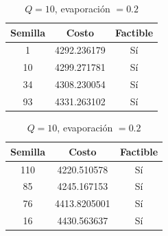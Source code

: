\documentclass{article}
\begin{document}
    \begin{table}[H]
      \begin{minipage}{0.5\linewidth}
        \centering
        \caption{$Q=1$, evaporación $= 0.2$}
        \begin{tabular}{c c c}
          \hline
          Semilla & Costo & Factible \\
          \hline
          1       & 4292.236179 & Sí \\
          10      & 4299.271781 & Sí \\
          34      & 4308.230054 & Sí \\
          93      & 4331.263102 & Sí \\
        \end{tabular}
      \end{minipage}
      \begin{minipage}{0.5\linewidth}
        \centering
        \caption{$Q=10$, evaporación $= 0.2$}
        \begin{tabular}{c c c}
          \hline
          Semilla & Costo & Factible   \\
          \hline
          110     & 4220.510578  & Sí  \\
          85      & 4245.167153  & Sí  \\
          76      & 4413.8205001 & Sí  \\
          16      & 4430.563637  & Sí  \\
        \end{tabular}
      \end{minipage}
    \end{table}
\end{document}
